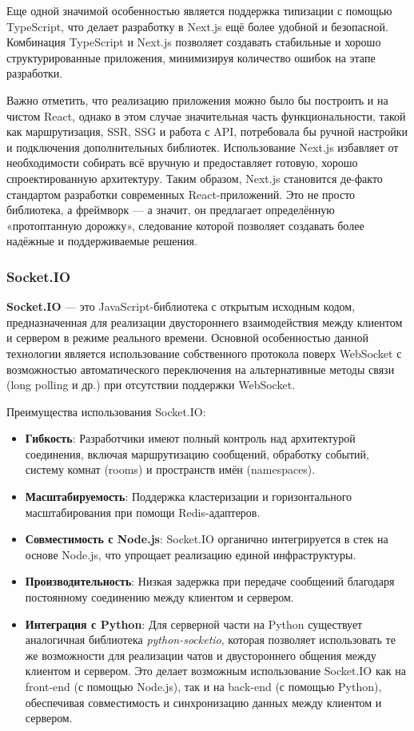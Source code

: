 Еще одной значимой особенностью является поддержка типизации с помощью TypeScript, что делает разработку в Next.js ещё более удобной и безопасной. Комбинация TypeScript и Next.js позволяет создавать стабильные и хорошо структурированные приложения, минимизируя количество ошибок на этапе разработки.

Важно отметить, что реализацию приложения можно было бы построить и на чистом React, однако в этом случае значительная часть функциональности, такой как маршрутизация, SSR, SSG и работа с API, потребовала бы ручной настройки и подключения дополнительных библиотек. Использование Next.js избавляет от необходимости собирать всё вручную и предоставляет готовую, хорошо спроектированную архитектуру. Таким образом, Next.js становится де-факто стандартом разработки современных React-приложений. Это не просто библиотека, а фреймворк — а значит, он предлагает определённую «протоптанную дорожку», следование которой позволяет создавать более надёжные и поддерживаемые решения.

\subsubsection{Socket.IO}

\textbf{Socket.IO} --- это JavaScript-библиотека с открытым исходным кодом, предназначенная для реализации двустороннего взаимодействия между клиентом и сервером в режиме реального времени. Основной особенностью данной технологии является использование собственного протокола поверх WebSocket с возможностью автоматического переключения на альтернативные методы связи (long polling и др.) при отсутствии поддержки WebSocket.

Преимущества использования Socket.IO:
\begin{itemize}
    \item \textbf{Гибкость}: Разработчики имеют полный контроль над архитектурой соединения, включая маршрутизацию сообщений, обработку событий, систему комнат (rooms) и пространств имён (namespaces).
    \item \textbf{Масштабируемость}: Поддержка кластеризации и горизонтального масштабирования при помощи Redis-адаптеров.
    \item \textbf{Совместимость с Node.js}: Socket.IO органично интегрируется в стек на основе Node.js, что упрощает реализацию единой инфраструктуры.
    \item \textbf{Производительность}: Низкая задержка при передаче сообщений благодаря постоянному соединению между клиентом и сервером.
    \item \textbf{Интеграция с Python}: Для серверной части на Python существует аналогичная библиотека \textit{python-socketio}, которая позволяет использовать те же возможности для реализации чатов и двустороннего общения между клиентом и сервером. Это делает возможным использование Socket.IO как на front-end (с помощью Node.js), так и на back-end (с помощью Python), обеспечивая совместимость и синхронизацию данных между клиентом и сервером.
\end{itemize}

